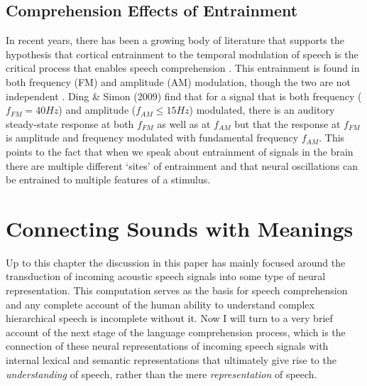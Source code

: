 \documentclass[titlepage]{article}
\begin{document}
  \subsection{Comprehension Effects of Entrainment}

    In recent years, there has been a growing body of literature that supports the hypothesis
    that cortical entrainment to the temporal modulation of speech is the critical process
    that enables speech comprehension \cite{Meyer2018,Morillon2015,ZionGolumbic2013,Doelling2014}.
    This entrainment is found in both frequency (FM) and amplitude (AM) modulation, though the
    two are not independent \cite{Ding2009}. Ding \& Simon (2009) \cite{Ding2009} find that for a signal that
    is both frequency ($f_{FM}=40Hz$) and amplitude ($f_{AM}\leq 15Hz$) modulated, there is an auditory
    steady-state response at both $f_{FM}$ as well as at $f_{AM}$ but that the response at $f_{FM}$ is
    amplitude and frequency modulated with fundamental frequency $f_{AM}$. This points to the fact that
    when we speak about entrainment of signals in the brain there are multiple different `sites' of entrainment
    and that neural oscillations can be entrained to multiple features of a stimulus.

\section{Connecting Sounds with Meanings} \label{meaning}

  Up to this chapter the discussion in this paper has mainly focused around the transduction of incoming
  acoustic speech signals into some type of neural representation. This computation serves as the basis
  for speech comprehension and any complete account of the human ability to understand complex hierarchical
  speech is incomplete without it. Now I will turn to a very brief account of the next stage of the
  language comprehension process, which is the connection of these neural representations of incoming
  speech signals with internal lexical and semantic representations that ultimately give rise to the
  \textit{understanding} of speech, rather than the mere \textit{representation} of speech.

\newpage
\printbibliography
\end{document}
